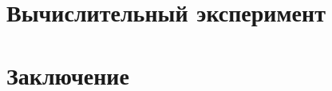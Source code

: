 \documentclass{fefu}
\begin{document}
  \section{Вычислительный эксперимент}
  

  \section*{Заключение}
  

  \newpage
  \nocite{*} %
  
  
\end{document}
